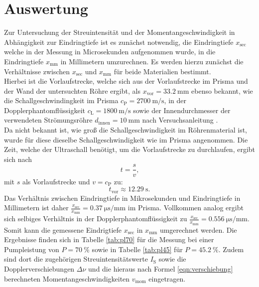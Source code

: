 \section{Auswertung}
\label{sec:Auswertung}





Zur Untersuchung der Streuintensität und der Momentangeschwindigkeit in Abhängigkeit zur Eindringtiefe ist es zunächst notwendig, die Eindringtiefe $x_{\mathrm{sec}}$ welche in der Messung in Microsekunden aufgenommen wurde, in die Eindringtiefe $x_{\mathrm{mm}}$ in Millimetern umzurechnen.
Es werden hierzu zunächst die Verhältnisse zwischen $x_{\mathrm{sec}}$ und $x_{\mathrm{mm}}$ für beide Materialien bestimmt.\\
Hierbei ist die Vorlaufstrecke, welche sich aus der Vorlaufstrecke im Prisma und der Wand der untersuchten Röhre ergibt, als $x_\mathrm{vor}=\SI{33.2}{\milli\meter}$ ebenso bekannt, wie die Schallgeschwindingkeit im Prisma $c_\mathrm{P}=\SI{2700}{\meter\per\second}$, in der Dopplerphantomflüssigkeit $c_\mathrm{L}=\SI{1800}{\meter\per\second}$ sowie der Innendurchmesser der verwendeten Strömungsröhre $d_\mathrm{innen}=\SI{10}{\milli\meter}$ nach Versuchsanleitung \cite{Anleitung}.\\
Da nicht bekannt ist, wie groß die Schallgeschwindigkeit im Röhrenmaterial ist, wurde für diese dieselbe Schallgeschwindigkeit wie im Prisma angenommen.
Die Zeit, welche der Ultraschall benötigt, um die Vorlaufstrecke zu durchlaufen, ergibt sich nach
\begin{equation*}
  t=\frac{s}{v} \text{,}
\end{equation*}
mit $s$ als Vorlaufstrecke und $v=c_\mathrm{P}$ zu:
\begin{equation*}
    t_\mathrm{vor}\approx\SI{12.29}{\second}\text{.}
\end{equation*}
Das Verhältnis zwischen Eindringtiefe in Mikrosekunden und Eindringtiefe in Millimetern ist daher $\frac{x_\mathrm{sec}}{x_\mathrm{mm}}=\SI{0.37}{\micro\second\per\milli\meter}$ im Prisma. Vollkommen analog ergibt sich selbiges Verhältnis in der Dopplerphantomflüssigkeit zu $\frac{x_\mathrm{sec}}{x_\mathrm{mm}}=\SI{0.556}{\micro\second\per\milli\meter}$.
\\Somit kann die gemessene Eindrigtiefe $x_\mathrm{sec}$ in $x_\mathrm{mm}$ umgerechnet werden. Die Ergebnisse finden sich in Tabelle \ref{tab:pl70} für die Messung bei einer Pumpleistung von $P=\SI{70}{\percent}$ sowie in Tabelle  \ref{tab:pl45} für $P=\SI{45.2}{\percent}$.
Zudem sind dort die zugehörigen Streuintensitätswerte $I_\mathrm{S}$ sowie die Dopplerverschiebungen $\Delta \nu$ und die hieraus nach Formel \eqref{eqn:verschiebung} berechneten Momentangeschwindigkeiten $v_\mathrm{mom}$ eingetragen.

